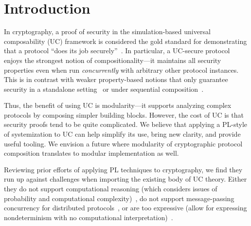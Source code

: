 \section{Introduction}
\label{sec:introduction}

In cryptography, a proof of security in the simulation-based universal composability (UC)
framework is considered the gold standard for demonstrating that a protocol ``does its job
securely''~\cite{canetti2001universally}. In particular, a UC-secure protocol
enjoys the strongest notion of compositionality---it maintains all security
properties even when run \emph{concurrently} with arbitrary other protocol instances.
This is in contrast with weaker property-based notions that only guarantee security in a standalone
setting~\cite{lindell2014introduction} or under sequential
composition~\cite{goldreich1987play}.
%
\begin{comment}
In a nutshell, security proofs in UC follow the real/ideal
paradigm~\cite{goldreich1987play}. The security requirements of a given task are
defined as a program for a \emph{single trusted process} called an \emph{ideal
  functionality}, which runs in an imagined ideal world. This serves as a
specification of the desired security properties for a distributed protocol
achieving the task across \emph{many unstrusted processes}, which runs in the
real world. Roughly speaking, we say that a protocol $\pi$ \emph{emulates} an
ideal functionality $\mc{F}$ (i.e., it meets its specification) if every
adversarial behavior in the real world can also be exhibited in the ideal world.
\end{comment}
%
Thus, the benefit of using UC is
modularity---it supports analyzing complex protocols by composing simpler
building blocks.
However, the cost of UC is that security proofs tend to be quite
complicated.
We believe that applying a PL-style of systemization to UC can help
simplify its use, bring new clarity, and provide useful tooling.
We envision a future where modularity of cryptographic protocol composition
translates to modular implementation as well.

Reviewing prior efforts of applying PL techniques to cryptography,
we find they run up against challenges when importing the existing
body of UC theory.
Either they do not support
computational reasoning (which considers issues of probability and computational
complexity)~\cite{bohl2016symbolic}, do not support message-passing concurrency for distributed protocols~\cite{barthe2011computer},
or are too expressive (allow for expressing nondeterminism with no computational interpretation)~\cite{abadi1999calculus}.

